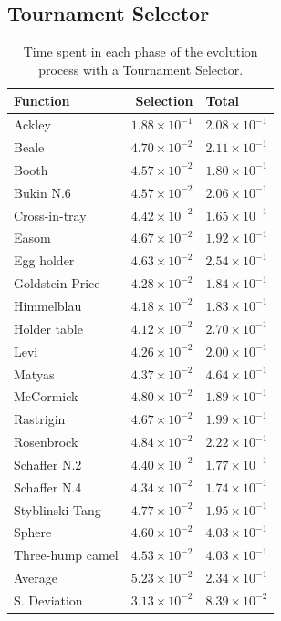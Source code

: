   \subsection{Tournament Selector}
      \centering
      \begin{longtable}{|l|r|l|}
        \caption{
        Time spent in each phase of the evolution process with a Tournament Selector.
      }\\
        \hline
        Function          & Selection             & Total \\
        \hline\hline
        Ackley	          & $1.88 \times 10^{-1}$	& $2.08 \times 10^{-1}$	\\\hline
        Beale	            & $4.70 \times 10^{-2}$	& $2.11 \times 10^{-1}$	\\\hline
        Booth	            & $4.57 \times 10^{-2}$	& $1.80 \times 10^{-1}$	\\\hline
        Bukin N.6	        & $4.57 \times 10^{-2}$	& $2.06 \times 10^{-1}$	\\\hline
        Cross-in-tray	    & $4.42 \times 10^{-2}$	& $1.65 \times 10^{-1}$	\\\hline
        Easom	            & $4.67 \times 10^{-2}$	& $1.92 \times 10^{-1}$	\\\hline
        Egg holder	      & $4.63 \times 10^{-2}$	& $2.54 \times 10^{-1}$	\\\hline
        Goldstein-Price	  & $4.28 \times 10^{-2}$	& $1.84 \times 10^{-1}$	\\\hline
        Himmelblau	      & $4.18 \times 10^{-2}$	& $1.83 \times 10^{-1}$	\\\hline
        Holder table	    & $4.12 \times 10^{-2}$	& $2.70 \times 10^{-1}$	\\\hline
        Levi	            & $4.26 \times 10^{-2}$	& $2.00 \times 10^{-1}$	\\\hline
        Matyas	          & $4.37 \times 10^{-2}$	& $4.64 \times 10^{-1}$	\\\hline
        McCormick       	& $4.80 \times 10^{-2}$	& $1.89 \times 10^{-1}$	\\\hline
        Rastrigin	        & $4.67 \times 10^{-2}$	& $1.99 \times 10^{-1}$	\\\hline
        Rosenbrock	      & $4.84 \times 10^{-2}$	& $2.22 \times 10^{-1}$	\\\hline
        Schaffer N.2	    & $4.40 \times 10^{-2}$	& $1.77 \times 10^{-1}$	\\\hline
        Schaffer N.4	    & $4.34 \times 10^{-2}$	& $1.74 \times 10^{-1}$	\\\hline
        Styblinski-Tang	  & $4.77 \times 10^{-2}$	& $1.95 \times 10^{-1}$	\\\hline
        Sphere	          & $4.60 \times 10^{-2}$	& $4.03 \times 10^{-1}$	\\\hline
        Three-hump camel	& $4.53 \times 10^{-2}$	& $4.03 \times 10^{-1}$	\\\hline
       \hline Average	    & $5.23 \times 10^{-2}$	& $2.34 \times 10^{-1}$ \\\hline
       S. Deviation	      & $3.13 \times 10^{-2}$	& $8.39 \times 10^{-2}$ \\\hline
      \end{longtable}
      
